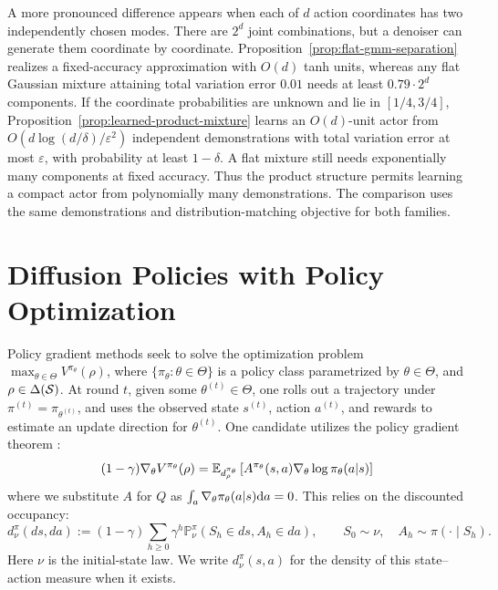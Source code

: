 \begin{exmp}
A more pronounced difference appears when each of $d$ action coordinates has two independently chosen modes. There are $2^d$ joint combinations, but a denoiser can generate them coordinate by coordinate. Proposition~\ref{prop:flat-gmm-separation} realizes a fixed-accuracy approximation with $O(d)$ tanh units, whereas any flat Gaussian mixture attaining total variation error $0.01$ needs at least $0.79\cdot2^d$ components. If the coordinate probabilities are unknown and lie in $[1/4,3/4]$, Proposition~\ref{prop:learned-product-mixture} learns an $O(d)$-unit actor from $O(d\log(d/\delta)/\varepsilon^2)$ independent demonstrations with total variation error at most $\varepsilon$, with probability at least $1-\delta$. A flat mixture still needs exponentially many components at fixed accuracy. Thus the product structure permits learning a compact actor from polynomially many demonstrations. The comparison uses the same demonstrations and distribution-matching objective for both families.
\end{exmp}

\section{Diffusion Policies with Policy Optimization}
\label{sec:policy-opt}

Policy gradient methods seek to solve the optimization problem $\max_{\theta \in \Theta} V^{\pi_\theta}(\rho)$, where $\{\pi_\theta : \theta \in \Theta\}$ is a policy class parametrized by $\theta \in \Theta$, and $\rho \in \Delta({\mathcal{S}})$. 
At round $t$, given some $\theta^{(t)} \in \Theta$, one rolls out a trajectory under $\pi^{(t)} = \pi_{\theta^{(t)}}$, and uses the observed state $s^{(t)}$, action $a^{(t)}$, and rewards to estimate an update direction for $\theta^{(t)}$. One candidate utilizes the policy gradient theorem \citep{sutton1999policygradient}:
\begin{equation}
    (1-\gamma)\nabla_\theta V^{\pi_\theta}(\rho) = \mathbb{E}_{d_\rho^{\pi_\theta}}\left[A^{\pi_\theta}(s,a) \nabla_\theta \log \pi_{\theta}(a|s)\right]
\label{eq:policy-gradient-thm}
\end{equation}
where we substitute $A$ for $Q$ as $\int_a\nabla_\theta\pi_\theta(a|s) \mathrm{d} a = 0$. This relies on the discounted occupancy:
$$d_\nu^\pi(ds,da):=(1-\gamma)\sum_{h\geq0}\gamma^h
\mathbb{P}_\nu^\pi(S_h\in ds,A_h\in da),\qquad S_0\sim\nu,\quad A_h\sim\pi(\cdot\mid S_h).$$
Here $\nu$ is the initial-state law. We write $d_\nu^\pi(s,a)$ for the density of this state--action measure when it exists.

